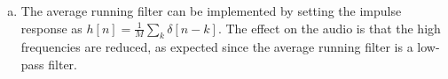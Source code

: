 \begin{enumerate}
\begin{enumerate}[a)]
    \item The average running filter can be implemented by setting the impulse 
    response as $h[n]=\frac{1}{M}\sum_k \delta[n-k]$. The effect on the audio is 
    that the high frequencies are reduced, as expected since the average running filter is a low-pass filter. 

    

\end{enumerate}
\end{enumerate}